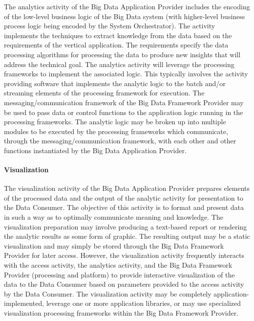 \documentclass[10pt]{article}
\begin{document}
The analytics activity of the Big Data Application Provider includes the encoding of the low-level business logic of the Big Data system (with higher-level business process logic being encoded by the System Orchestrator). The activity implements the techniques to extract knowledge from the data based on the requirements of the vertical application. The requirements specify the data processing algorithms for processing the data to produce new insights that will address the technical goal. The analytics activity will leverage the processing frameworks to implement the associated logic. This typically involves the activity providing software that implements the analytic logic to the batch and/or streaming elements of the processing framework for execution. The messaging/communication framework of the Big Data Framework Provider may be used to pass data or control functions to the application logic running in the processing frameworks. The analytic logic may be broken up into multiple modules to be executed by the processing frameworks which communicate, through the messaging/communication framework, with each other and other functions instantiated by the Big Data Application Provider.

\paragraph{Visualization}

The visualization activity of the Big Data Application Provider prepares elements of the processed data and the output of the analytic activity for presentation to the Data Consumer. The objective of this activity is to format and present data in such a way as to optimally communicate meaning and knowledge. The visualization preparation may involve producing a text-based report or rendering the analytic results as some form of graphic. The resulting output may be a static visualization and may simply be stored through the Big Data Framework Provider for later access. However, the visualization activity frequently interacts with the access activity, the analytics activity, and the Big Data Framework Provider (processing and platform) to provide interactive visualization of the data to the Data Consumer based on parameters provided to the access activity by the Data Consumer. The visualization activity may be completely application-implemented, leverage one or more application libraries, or may use specialized visualization processing frameworks within the Big Data Framework Provider. 
\end{document}
